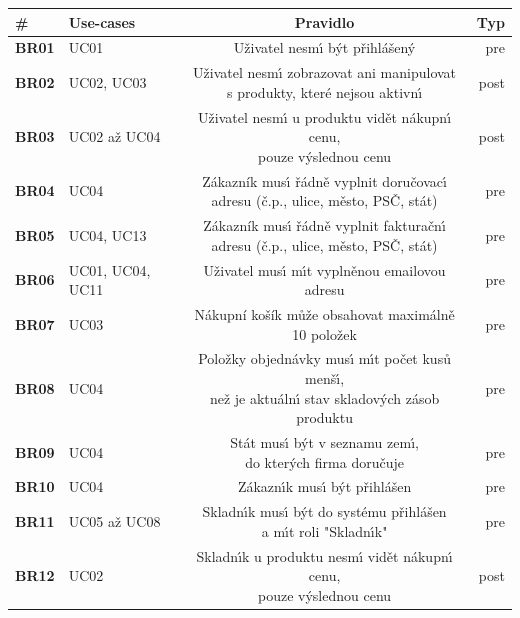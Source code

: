 \begin{table}
    \centering
    \begin{tabular}{ l l c r }
        \hline
        \textbf{\#} & \textbf{Use-cases} & \textbf{Pravidlo} & \textbf{Typ} \\ \hline \hline
        \textbf{BR01} & UC01 & Uživatel nesm\'{\i} b\'yt přihlášen\'y & pre \\ \hline
        \textbf{BR02} & UC02, UC03 & \makecell[c]{Uživatel nesm\'{\i} zobrazovat ani manipulovat \\ s produkty, které nejsou aktivn\'{\i}} & post \\ \hline
        \textbf{BR03} & UC02 až UC04 & \makecell[c]{Uživatel nesm\'{\i} u produktu vidět nákupn\'{\i} cenu, \\ pouze v\'yslednou cenu} & post \\ \hline
        \textbf{BR04} & UC04 & \makecell[c]{Zákazník mus\'{\i} řádně vyplnit doručovac\'{\i} \\ adresu (č.p., ulice, město, PSČ, stát)} & pre \\ \hline
        \textbf{BR05} & UC04, UC13 & \makecell[c]{Zákazník mus\'{\i} řádně vyplnit fakturačn\'{\i} \\ adresu (č.p., ulice, město, PSČ, stát)} & pre \\ \hline
        \textbf{BR06} & UC01, UC04, UC11 & Uživatel mus\'{\i} m\'{\i}t vyplněnou emailovou adresu & pre \\ \hline
        \textbf{BR07} & UC03 & Nákupní košík může obsahovat maximálně 10 položek & pre \\ \hline
        \textbf{BR08} & UC04 & \makecell[c]{Položky objednávky mus\'{\i} m\'{\i}t počet kusů menš\'{\i}, \\ než je aktuáln\'{\i} stav skladov\'ych zásob produktu} & pre \\ \hline
        \textbf{BR09} & UC04 & \makecell[c]{Stát mus\'{\i} b\'yt v seznamu zem\'{\i}, \\ do kter\'ych firma doručuje} & pre \\ \hline
        \textbf{BR10} & UC04 & Zákazn\'{\i}k mus\'{\i} b\'yt přihlášen & pre \\ \hline
        \textbf{BR11} & UC05 až UC08 & \makecell[c]{Skladn\'{\i}k mus\'{\i} b\'yt do systému přihlášen \\ a m\'{\i}t roli "Skladn\'{\i}k"} & pre \\ \hline
        \textbf{BR12} & UC02 & \makecell[c]{Skladn\'{\i}k u produktu nesm\'{\i} vidět nákupn\'{\i} cenu, \\ pouze v\'yslednou cenu} & post \\ \hline

\end{tabular}
\end{table}
